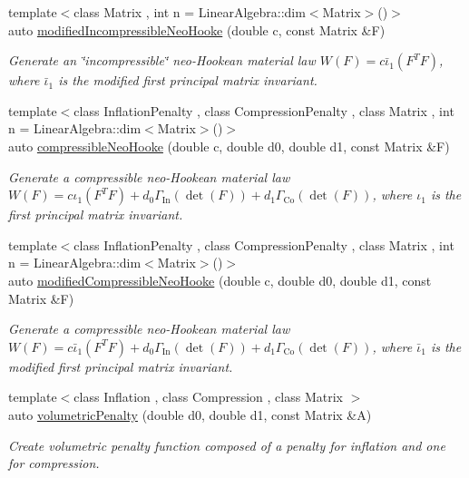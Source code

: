 \begin{DoxyCompactItemize}
{\footnotesize template$<$class Matrix , int n = \-Linear\-Algebra\-::dim$<$\-Matrix$>$()$>$ }\\auto \hyperlink{group__Rubber_gaf6f5ab6a379ef03d513acc5042731a01}{modified\-Incompressible\-Neo\-Hooke} (double c, const \-Matrix \&\-F)
\begin{DoxyCompactList}\small\item\em \-Generate an \char`\"{}incompressible\char`\"{} neo-\/\-Hookean material law $ W(F)=c\bar\iota_1(F^T F) $, where $\bar\iota_1$ is the modified first principal matrix invariant. \end{DoxyCompactList}\item 
{\footnotesize template$<$class Inflation\-Penalty , class Compression\-Penalty , class Matrix , int n = \-Linear\-Algebra\-::dim$<$\-Matrix$>$()$>$ }\\auto \hyperlink{group__Rubber_gac5c39cd9de55f4f0220a806cf28a7b30}{compressible\-Neo\-Hooke} (double c, double d0, double d1, const \-Matrix \&\-F)
\begin{DoxyCompactList}\small\item\em \-Generate a compressible neo-\/\-Hookean material law $ W(F)=c\iota_1(F^T F)+d_0\Gamma_\mathrm{In}(\det(F))+d_1\Gamma_\mathrm{Co}(\det(F)) $, where $\iota_1$ is the first principal matrix invariant. \end{DoxyCompactList}\item 
{\footnotesize template$<$class Inflation\-Penalty , class Compression\-Penalty , class Matrix , int n = \-Linear\-Algebra\-::dim$<$\-Matrix$>$()$>$ }\\auto \hyperlink{group__Rubber_gac10942df03f037afdf0a81d330361a6b}{modified\-Compressible\-Neo\-Hooke} (double c, double d0, double d1, const \-Matrix \&\-F)
\begin{DoxyCompactList}\small\item\em \-Generate a compressible neo-\/\-Hookean material law $ W(F)=c\bar\iota_1(F^T F)+d_0\Gamma_\mathrm{In}(\det(F))+d_1\Gamma_\mathrm{Co}(\det(F)) $, where $\bar\iota_1$ is the modified first principal matrix invariant. \end{DoxyCompactList}\item 
{\footnotesize template$<$class Inflation , class Compression , class Matrix $>$ }\\auto \hyperlink{namespaceFunG_ad26faeb264bb4b1cd7e70f3811c366c8}{volumetric\-Penalty} (double d0, double d1, const \-Matrix \&\-A)
\begin{DoxyCompactList}\small\item\em \-Create volumetric penalty function composed of a penalty for inflation and one for compression. \end{DoxyCompactList}\item 

\end{DoxyCompactItemize}
